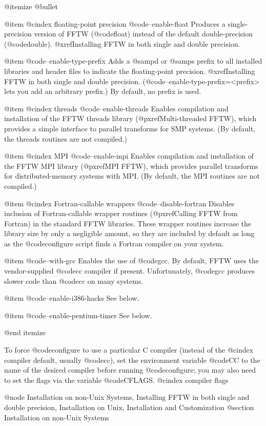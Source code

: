 @itemize @bullet

@item
@cindex floating-point precision
@code{--enable-float} Produces a single-precision version of FFTW
(@code{float}) instead of the default double-precision (@code{double}).
@xref{Installing FFTW in both single and double precision}.

@item
@code{--enable-type-prefix} Adds a @samp{d} or @samp{s} prefix to all
installed libraries and header files to indicate the floating-point
precision.  @xref{Installing FFTW in both single and double
precision}.  (@code{--enable-type-prefix=<prefix>} lets you add an
arbitrary prefix.)  By default, no prefix is used.

@item
@cindex threads
@code{--enable-threads} Enables compilation and installation of the FFTW
threads library (@pxref{Multi-threaded FFTW}), which provides a
simple interface to parallel transforms for SMP systems.  (By default,
the threads routines are not compiled.)

@item
@cindex MPI
@code{--enable-mpi} Enables compilation and installation of the FFTW MPI
library (@pxref{MPI FFTW}), which provides parallel transforms for
distributed-memory systems with MPI.  (By default, the MPI routines are
not compiled.)

@item
@cindex Fortran-callable wrappers
@code{--disable-fortran} Disables inclusion of Fortran-callable wrapper
routines (@pxref{Calling FFTW from Fortran}) in the standard FFTW
libraries.  These wrapper routines increase the library size by only a
negligible amount, so they are included by default as long as the
@code{configure} script finds a Fortran compiler on your system.

@item
@code{--with-gcc} Enables the use of @code{gcc}.  By default, FFTW uses
the vendor-supplied @code{cc} compiler if present.  Unfortunately,
@code{gcc} produces slower code than @code{cc} on many systems.

@item
@code{--enable-i386-hacks}  See below.

@item
@code{--enable-pentium-timer}  See below.

@end itemize

To force @code{configure} to use a particular C compiler (instead of the
@cindex compiler
default, usually @code{cc}), set the environment variable @code{CC} to
the name of the desired compiler before running @code{configure}; you
may also need to set the flags via the variable @code{CFLAGS}.
@cindex compiler flags

@node Installation on non-Unix Systems, Installing FFTW in both single and double precision, Installation on Unix, Installation and Customization
@section Installation on non-Unix Systems

